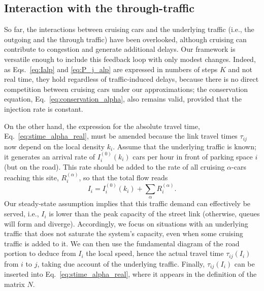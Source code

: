 \documentclass[trsc,reprint]{informs3}
\newcommand{\alp}{^{(\alpha)}}
\newcommand{\AN}[1]{#1}
\begin{document}
\AN{
\subsection{Interaction with the through-traffic}

So far, the interactions between cruising cars and the underlying traffic (i.e., the outgoing
and the through traffic) have been overlooked, although cruising can contribute to congestion and generate additional delays. 
Our framework is versatile enough to include this feedback loop with only 
modest changes. Indeed, as Eqs.~\ref{eq:Ialp} and \ref{eq:P_j_alp} are expressed in numbers of steps $K$ and not real time, they hold regardless of traffic-induced delays, because there is no direct competition between cruising cars under our approximations;
the conservation equation, Eq.~\ref{eq:conservation_alpha}, also remains valid, provided that the injection rate is constant. 

On the other hand, the expression for the absolute travel time, Eq.~\ref{eq:stime_alpha_real}, must be amended because the link travel times $\tau_{ij}$ 
now depend on the local density $k_i$. Assume that the underlying traffic is known; it generates an arrival rate of $I^{(0)}_i(k_i)$ cars per hour in front of parking space $i$ (but on the
road). This rate should be added to
the rate of all cruising $\alpha$-cars reaching this site, $R\alp_i$, so that the total flow reads
\begin{equation}
I_i= I^{(0)}_i(k_i) + \sum_{\alpha} R\alp_i.
\label{eq:total_flow_rate}
\end{equation}
Our steady-state assumption implies that this traffic demand can effectively be served, i.e., $I_i$ is lower
than the peak capacity of the street link (otherwise, queues will form and diverge). Accordingly,
we focus on situations with an underlying traffic that does not saturate the system's capacity, even when some cruising traffic is added to it.
We can then use
the fundamental diagram of the road portion to deduce from $I_i$ the local speed, hence the 
actual travel time $\tau_{ij}(I_i)$ from $i$ to $j$, taking due account of the underlying traffic.
Finally, $\tau_{ij}(I_i)$ can be inserted into Eq.~\ref{eq:stime_alpha_real}, where it appears in the
definition of the matrix $N$.


}
\end{document}
